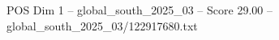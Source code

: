 \begin{textsample}{POS Dim 1 – global\_south\_2025\_03 – Score 29.00 – global\_south\_2025\_03/122917680.txt}
\end{textsample}
